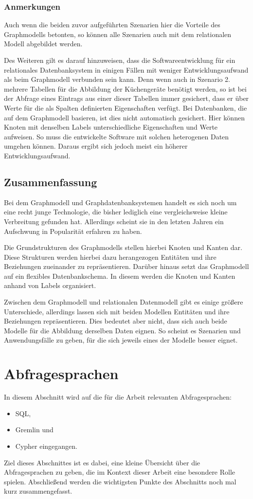 \subsubsection{Anmerkungen}
Auch wenn die beiden zuvor aufgeführten Szenarien hier die Vorteile des Graphmodells betonten, so können alle Szenarien auch mit dem relationalen Modell abgebildet werden. 

Des Weiteren gilt es darauf hinzuweisen, dass die Softwareentwicklung für ein relationales Datenbanksystem in einigen Fällen mit weniger Entwicklungsaufwand als beim Graphmodell verbunden sein kann. Denn wenn auch in Szenario 2. mehrere Tabellen für die Abbildung der Küchengeräte benötigt werden, so ist bei der Abfrage eines Eintrags aus einer dieser Tabellen immer gesichert, dass er über Werte für die als Spalten definierten Eigenschaften verfügt. Bei Datenbanken, die auf dem Graphmodell basieren, ist dies nicht automatisch gesichert. Hier können Knoten mit denselben Labels unterschiedliche Eigenschaften und Werte aufweisen. So muss die entwickelte Software mit solchen heterogenen Daten umgehen können. Daraus ergibt sich jedoch meist ein höherer Entwicklungsaufwand. 

\subsection{Zusammenfassung}
Bei dem Graphmodell und Graphdatenbanksystemen handelt es sich noch um eine recht junge Technologie, die bisher lediglich eine vergleichsweise kleine Verbreitung gefunden hat. Allerdings scheint sie in den letzten Jahren ein Aufschwung in Popularität erfahren zu haben. 

Die Grundstrukturen des Graphmodells stellen hierbei Knoten und Kanten dar. Diese Strukturen werden hierbei dazu herangezogen Entitäten und ihre Beziehungen zueinander zu repräsentieren. Darüber hinaus setzt das Graphmodell auf ein flexibles Datenbankschema. In diesem werden die Knoten und Kanten anhand von Labels organisiert.

Zwischen dem Graphmodell und relationalen Datenmodell gibt es einige größere Unterschiede, allerdings lassen sich mit beiden Modellen Entitäten und ihre Beziehungen repräsentieren. Dies bedeutet aber nicht, dass sich auch beide Modelle für die Abbildung derselben Daten eignen. So scheint es Szenarien und Anwendungsfälle zu geben, für die sich jeweils eines der Modelle besser eignet. 

\section{Abfragesprachen}
In diesem Abschnitt wird auf die für die Arbeit relevanten Abfragesprachen:
\begin{itemize}
    \item SQL,
    \item Gremlin und
    \item Cypher eingegangen.
\end{itemize}
Ziel dieses Abschnittes ist es dabei, eine kleine Übersicht über die Abfragesprachen zu geben, die im Kontext dieser Arbeit eine besondere Rolle spielen. Abschließend werden die wichtigsten Punkte des Abschnitts noch mal kurz zusammengefasst.


